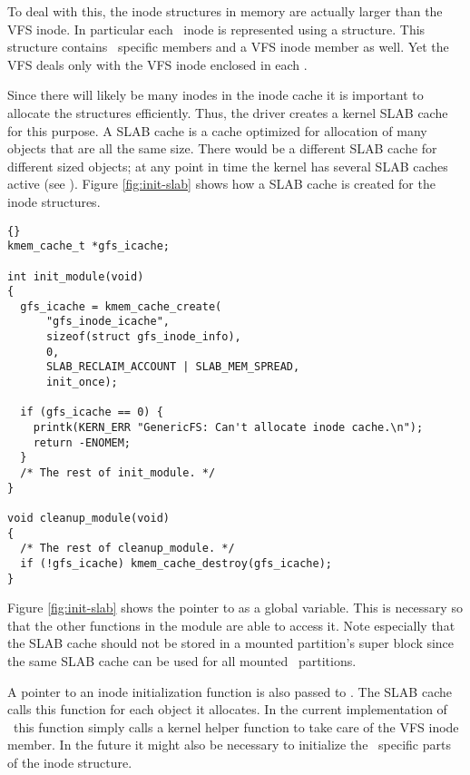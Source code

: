 To deal with this, the inode structures in memory are actually larger than the VFS inode. In
particular each \GenericFS\ inode is represented using a  structure. This
structure contains \GenericFS\ specific members and a VFS inode member as well. Yet the VFS
deals only with the VFS inode enclosed in each .

Since there will likely be many inodes in the inode cache it is important to allocate the
 structures efficiently. Thus, the driver creates a kernel SLAB cache for
this purpose. A SLAB cache is a cache optimized for allocation of many objects that are all the
same size. There would be a different SLAB cache for different sized objects; at any point in
time the kernel has several SLAB caches active (see ). Figure
\ref{fig:init-slab} shows how a SLAB cache is created for the inode structures.

\begin{figure*}[tp]
  \centering
  \begin{wbigbox}
\begin{lstlisting}{}
kmem_cache_t *gfs_icache;

int init_module(void)
{
  gfs_icache = kmem_cache_create(
      "gfs_inode_icache",
      sizeof(struct gfs_inode_info),
      0,
      SLAB_RECLAIM_ACCOUNT | SLAB_MEM_SPREAD,
      init_once);

  if (gfs_icache == 0) {
    printk(KERN_ERR "GenericFS: Can't allocate inode cache.\n");
    return -ENOMEM;
  }
  /* The rest of init_module. */
}

void cleanup_module(void)
{
  /* The rest of cleanup_module. */
  if (!gfs_icache) kmem_cache_destroy(gfs_icache);
}
\end{lstlisting}    
  \end{wbigbox}
  \caption{Initializing and Removing a SLAB Cache}
  \label{fig:init-slab}
\end{figure*}

Figure \ref{fig:init-slab} shows the pointer to  as a global variable. This
is necessary so that the other functions in the module are able to access it. Note especially
that the SLAB cache should not be stored in a mounted partition's super block since the same
SLAB cache can be used for all mounted \GenericFS\ partitions.

A pointer to an inode initialization function  is also passed to
. The SLAB cache calls this function for each object it allocates.
In the current implementation of \GenericFS\ this function simply calls a kernel helper function
 to take care of the VFS inode member. In the future it might also be
necessary to initialize the \GenericFS\ specific parts of the inode structure.

